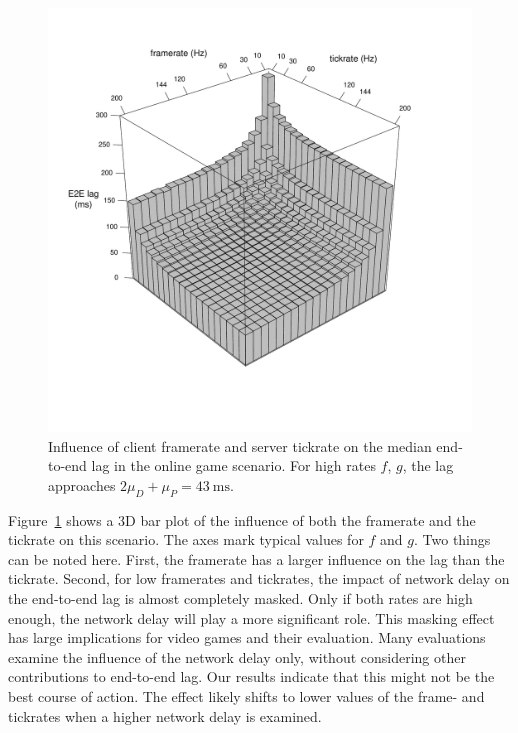 \begin{figure}[!t]
	\centering
	\vspace{-6mm}
	\includegraphics[width=1.0\columnwidth]{../simulation/visualization/e2e-lag-3dbars.pdf}
	\vspace{-15mm}
	\caption{Influence of client framerate and server tickrate on the median end-to-end lag in the online game scenario. For high rates $f$, $g$, the lag approaches $2\mu_D+\mu_P=\SI{43}{\milli\second}$.}
\label{fig:3dbars-framerate-tickrate-lag}
\end{figure}

Figure~\ref{fig:3dbars-framerate-tickrate-lag} shows a 3D bar plot 
of the influence of both the framerate and the tickrate on this 
scenario. The axes mark typical values for $f$ and $g$. Two things 
can be noted here. First, the framerate has a larger influence on 
the lag than the tickrate. Second, for low framerates and tickrates, 
the impact of network delay on the end-to-end lag is almost 
completely masked. Only if both rates 
are high enough, the network delay will play a more significant role.
This masking effect has large implications for video games and their evaluation. Many evaluations examine the influence of the network delay only, without considering other contributions to end-to-end lag. Our results indicate that this might not be the best course of action. The effect likely shifts to lower values of the frame- and tickrates when a higher network delay is examined.

